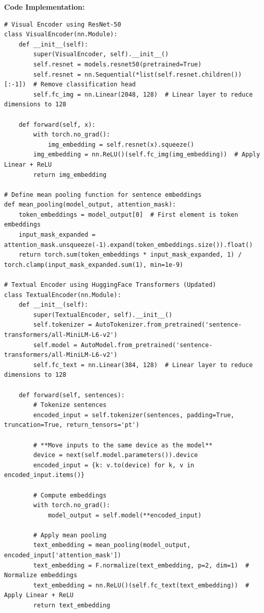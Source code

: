 \documentclass[11pt, oneside]{article}   	%
\begin{document}
\textbf{Code Implementation: } 
\\
\begin{verbatim}
# Visual Encoder using ResNet-50
class VisualEncoder(nn.Module):
    def __init__(self):
        super(VisualEncoder, self).__init__()
        self.resnet = models.resnet50(pretrained=True)
        self.resnet = nn.Sequential(*list(self.resnet.children())[:-1])  # Remove classification head
        self.fc_img = nn.Linear(2048, 128)  # Linear layer to reduce dimensions to 128

    def forward(self, x):
        with torch.no_grad():
            img_embedding = self.resnet(x).squeeze()
        img_embedding = nn.ReLU()(self.fc_img(img_embedding))  # Apply Linear + ReLU
        return img_embedding

# Define mean pooling function for sentence embeddings
def mean_pooling(model_output, attention_mask):
    token_embeddings = model_output[0]  # First element is token embeddings
    input_mask_expanded = attention_mask.unsqueeze(-1).expand(token_embeddings.size()).float()
    return torch.sum(token_embeddings * input_mask_expanded, 1) / torch.clamp(input_mask_expanded.sum(1), min=1e-9)

# Textual Encoder using HuggingFace Transformers (Updated)
class TextualEncoder(nn.Module):
    def __init__(self):
        super(TextualEncoder, self).__init__()
        self.tokenizer = AutoTokenizer.from_pretrained('sentence-transformers/all-MiniLM-L6-v2')
        self.model = AutoModel.from_pretrained('sentence-transformers/all-MiniLM-L6-v2')
        self.fc_text = nn.Linear(384, 128)  # Linear layer to reduce dimensions to 128

    def forward(self, sentences):
        # Tokenize sentences
        encoded_input = self.tokenizer(sentences, padding=True, truncation=True, return_tensors='pt')

        # **Move inputs to the same device as the model**
        device = next(self.model.parameters()).device
        encoded_input = {k: v.to(device) for k, v in encoded_input.items()}

        # Compute embeddings
        with torch.no_grad():
            model_output = self.model(**encoded_input)

        # Apply mean pooling
        text_embedding = mean_pooling(model_output, encoded_input['attention_mask'])
        text_embedding = F.normalize(text_embedding, p=2, dim=1)  # Normalize embeddings
        text_embedding = nn.ReLU()(self.fc_text(text_embedding))  # Apply Linear + ReLU
        return text_embedding


\end{verbatim}
\end{document}
